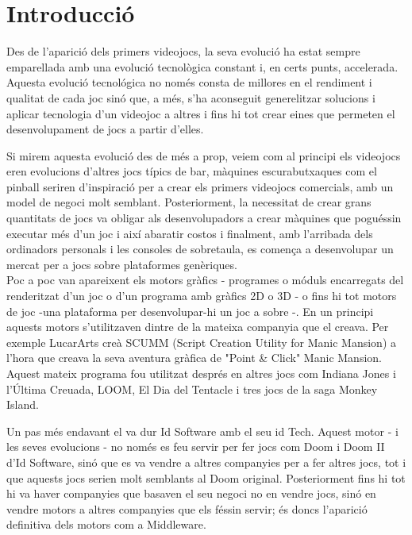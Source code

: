 \newpage
\section{Introducció}

Des de l'aparició dels primers videojocs, la seva evolució ha estat sempre emparellada amb una evolució tecnològica constant i, en certs punts, accelerada. Aquesta evolució tecnológica no només consta de millores en el rendiment i qualitat de cada joc sinó que, a més, s'ha aconseguit generelitzar solucions i aplicar tecnologia d'un videojoc a altres i fins hi tot crear eines que permeten el desenvolupament de jocs a partir d'elles.

Si mirem aquesta evolució des de més a prop, veiem com al principi els videojocs eren evolucions d'altres jocs típics de bar, màquines escurabutxaques com el pinball seriren d'inspiració per a crear els primers videojocs comercials, amb un model de negoci molt semblant. Posteriorment, la necessitat de crear grans quantitats de jocs va obligar als desenvolupadors a crear màquines que poguéssin executar més d'un joc i així abaratir costos i finalment, amb l'arribada dels ordinadors personals i les consoles de sobretaula, es comença a desenvolupar un mercat per a jocs sobre plataformes genèriques.
\\

Poc a poc van apareixent els motors gràfics - programes o móduls encarregats del renderitzat d'un joc o d'un programa amb gràfics 2D o 3D - o fins hi tot motors de joc -una plataforma per desenvolupar-hi un joc a sobre -. En un principi aquests motors s'utilitzaven dintre de la mateixa companyia que el creava. Per exemple LucarArts creà {SCUMM} ({Script Creation Utility for Manic Mansion}) a l'hora que creava la seva aventura gràfica de "Point \& Click" Manic Mansion. Aquest mateix programa fou utilitzat després en altres jocs com Indiana Jones i l'Última Creuada, LOOM, El Dia del Tentacle i tres jocs de la saga Monkey Island.

Un pas més endavant el va dur Id Software amb el seu id Tech. Aquest motor - i les seves evolucions - no només es feu servir per fer jocs com Doom i Doom II d'Id Software, sinó que es va vendre a altres companyies per a fer altres jocs, tot i que aquests jocs serien molt semblants al Doom original. Posteriorment fins hi tot hi va haver companyies que basaven el seu negoci no en vendre jocs, sinó en vendre motors a altres companyies que els féssin servir; és doncs l'aparició definitiva dels motors com a Middleware.
\\

